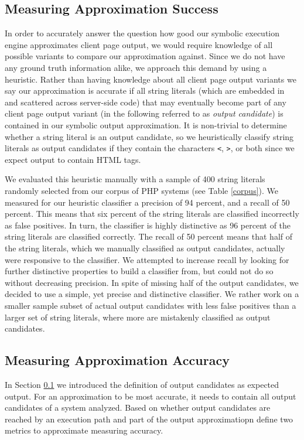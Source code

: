 \documentclass[sigconf]{acmart}
\renewcommand{\tt}[1]{\texttt{#1}}
\begin{document}
\subsection{Measuring Approximation Success} \label{heuristic}
In order to accurately answer the question how good our symbolic execution
engine approximates client page output, we would require knowledge of all
possible variants to compare our approximation against. Since we do not have
any ground truth information alike, we approach this demand by using a
heuristic. Rather than having knowledge about all client page output variants
we say our approximation is accurate if all string literals (which are embedded
in and  scattered across server-side code) that may eventually become part of any
client page output variant (in the following referred to as \emph{output
candidate}) is contained in our symbolic output approximation.
It is non-trivial to determine whether a string literal is an output candidate,
so we heuristically classify string literals as output candidates if they
contain the characters \tt{<}, \tt{>}, or both since we expect output to contain
HTML tags.

We evaluated this heuristic manually with a sample of 400 string
literals randomly selected from our corpus of PHP systems (see Table
\ref{corpus}). We measured for our heuristic classifier a precision of 94 percent, and a
recall of 50 percent. This means that six percent of the string literals are
classified incorrectly as false positives. In turn, the classifier is highly
distinctive as 96 percent of the string literals are classified correctly. The
recall of 50 percent means that half of the string literals, which we manually 
classified as output candidates, actually were responsive to the classifier. We
attempted to increase recall by looking for further distinctive properties to build a
classifier from, but could not do so without decreasing precision. 
In spite of missing half of the output candidates, we decided
to use a simple, yet precise and distinctive classifier. We rather work on a
smaller sample subset of actual output candidates with less false positives
than a larger set of string literals, where more are mistakenly classified as
output candidates.

\subsection{Measuring Approximation Accuracy}
\label{HowAccurateIsOurApproximation} 
In Section \ref{heuristic} we introduced the definition of output candidates as
expected output. For an approximation to be most accurate, it needs to contain
all output candidates of a system analyzed. Based on whether output
candidates are reached by an execution path and part of the output
approximatiopn define two metrics to approximate measuring accuracy.
\end{document}

